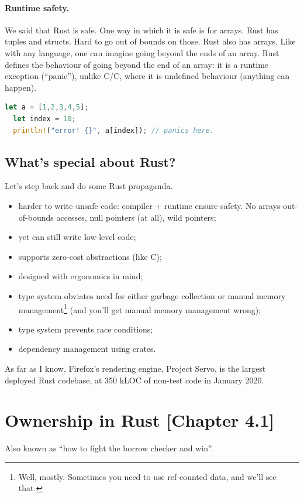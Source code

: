 \documentclass[a4paper]{report}
\newcommand{\CPP}{C\nolinebreak\hspace{-.05em}\raisebox{.4ex}{\tiny\bf +}\nolinebreak\hspace{-.10em}\raisebox{.4ex}{\tiny\bf +}}
\def\CPP{{C\nolinebreak[4]\hspace{-.05em}\raisebox{.4ex}{\tiny\bf ++}}}
\begin{document}
\paragraph{Runtime safety.} We said that Rust is safe. One way in which it is safe is for
arrays. Rust has tuples and structs. Hard to go out of bounds on those. Rust also has arrays.
Like with any language, one can imagine going beyond the ends of an array. Rust defines
the behaviour of going beyond the end of an array: it is a runtime exception (``panic''),
unlike C/\CPP, where it is undefined behaviour (anything can happen).


\begin{lstlisting}[language=Rust]
  let a = [1,2,3,4,5];
  let index = 10;
  println!("error! {}", a[index]); // panics here.
\end{lstlisting}

\subsection*{What's special about Rust?}
Let's step back and do some Rust propaganda.
\begin{itemize}[noitemsep]
\item harder to write unsafe code: compiler + runtime ensure safety. No arrays-out-of-bounds accesses, null pointers (at all), wild pointers;
\item yet can still write low-level code;
\item supports zero-cost abstractions (like \CPP);
\item designed with ergonomics in mind;
\item type system obviates need for either garbage collection or manual memory management\footnote{Well, mostly. Sometimes you need to use ref-counted data, and we'll see that.} (and you'll get manual memory management wrong);
\item type system prevents race conditions;
\item dependency management using crates.
\end{itemize}
As far as I know, Firefox's rendering engine, Project Servo, is the largest deployed Rust codebase, at 350 kLOC of non-test code in January 2020.


\section*{Ownership in Rust [Chapter 4.1]}
Also known as ``how to fight the borrow checker and win''.
\end{document}
